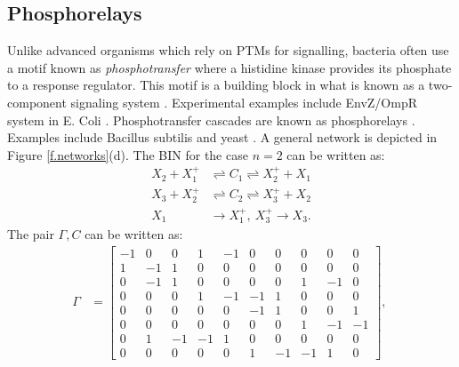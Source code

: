 \documentclass[onefignum,onetabnum]{siamonline220329}
\begin{document}
{\subsection{{Phosphorelays}}  	Unlike advanced organisms which rely on PTMs for signalling, bacteria often use a motif known as \textit{phosphotransfer} where   a histidine kinase provides its phosphate   to a response regulator. This motif is a building block in what is known as a two-component signaling system \cite{stock00}. Experimental examples include EnvZ/OmpR system in E. Coli \cite{batchelor03}.  Phosphotransfer cascades are known as phosphorelays \cite{appleby96,laub07}. Examples include Bacillus subtilis \cite{hoch00} and   yeast \cite{posas96}. A general network is depicted in Figure \ref{f.networks}(d). 
The {BIN} for the case $n=2$ can be written as:
\begin{align*} X_2+X_1^+ & \rightleftharpoons C_1 \rightleftharpoons  X_2^++X_1 \\
	 X_3+X_2^+ & \rightleftharpoons C_2 \rightleftharpoons  X_3^++X_2 \\
	 X_1 &\rightarrow X_1^+, ~ X_3^+ \rightarrow X_3.
\end{align*}
The pair $\Gamma, C$ can be written as:
{    \tiny \begin{align*} \Gamma&= \left[\begin{array}{rrrrrrrrrr} -1 & 0 & 0 & 1 & -1 & 0 & 0 & 0 & 0 & 0\\ 1 & -1 & 1 & 0 & 0 & 0 & 0 & 0 & 0 & 0\\ 0 & -1 & 1 & 0 & 0 & 0 & 0 & 1 & -1 & 0\\ 0 & 0 & 0 & 1 & -1 & -1 & 1 & 0 & 0 & 0\\ 0 & 0 & 0 & 0 & 0 & -1 & 1 & 0 & 0 & 1\\ 0 & 0 & 0 & 0 & 0 & 0 & 0 & 1 & -1 & -1\\ 0 & 1 & -1 & -1 & 1 & 0 & 0 & 0 & 0 & 0\\ 0 & 0 & 0 & 0 & 0 & 1 & -1 & -1 & 1 & 0 \end{array}\right], ~

\end{align*}}}
\end{document}
